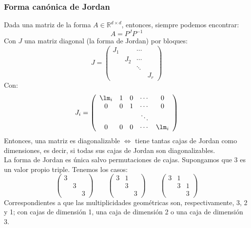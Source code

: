 \begin{enumerate}
    \subsubsection{Forma canónica de Jordan}
    Dada una matriz de la forma $A\in \mathbb{R}^{d\times d}$, entonces, siempre podemos encontrar:
    \begin{equation*}
        A = P^ J P^{-1}
    \end{equation*}
    Con $J$ una matriz diagonal (la forma de Jordan) por bloques:
    \begin{equation*}
        J = \left(\begin{array}{cccc}
                J_1 & & \cdots & \\
                    & J_2 & \cdots & \\
                    & & \ddots & \\
                    & & & J_r

        \end{array}\right)
    \end{equation*}
    Con:
    \begin{equation*}
        J_i = \left(\begin{array}{ccccc}
                \lm_i & 1 & 0 & \cdots & 0 \\
                0 & 0 & 1 & \cdots & 0 \\
                  & & & \ddots & \\
                0 & 0 & 0 & \cdots & \lm_i
        \end{array}\right)
    \end{equation*}
    Entonces, una matriz es diagonalizable $\Longleftrightarrow $ tiene tantas cajas de Jordan como dimensiones, es decir, si todas sus cajas de Jordan son diagonalizables.\\

    La forma de Jordan es única salvo permutaciones de cajas.
    Supongamos que 3 es un valor propio triple. Tenemos los casos:
    \begin{equation*}
        \left(\begin{array}{ccc}
             3 & & \\
               & 3 & \\
               & & 3
        \end{array}\right) \qquad 
        \left(\begin{array}{ccc}
             3 & 1 & \\
               & 3 & \\
               & & 3
        \end{array}\right) \qquad 
        \left(\begin{array}{ccc}
             3 & 1 & \\
               & 3 & 1 \\
               & & 3
        \end{array}\right)
    \end{equation*}
    Correspondientes a que las multiplicidades geométricas son, respectivamente, 3, 2 y 1; con cajas de dimensión 1, una caja de dimensión 2 o una caja de dimensión 3.


\end{enumerate}
